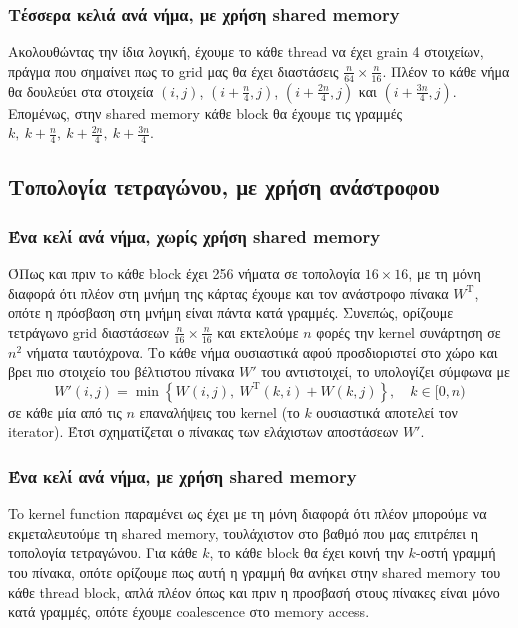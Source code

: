 \documentclass[11pt,a4paper,titlepage]{article}
\begin{document}
\subsubsection{Τέσσερα κελιά ανά νήμα, με χρήση shared memory}
Ακολουθώντας την ίδια λογική, έχουμε το κάθε thread να έχει grain 4 στοιχείων, πράγμα που σημαίνει πως το grid μας θα έχει διαστάσεις $\tfrac{n}{64}\times\tfrac{n}{16}$. Πλέον το κάθε νήμα θα δουλεύει στα στοιχεία $\left(i, j\right)$, $\left(i + \tfrac{n}{4}, j\right)$, $\left(i + \tfrac{2n}{4}, j\right)$ και $\left(i + \tfrac{3n}{4}, j\right)$. Επομένως, στην shared memory κάθε block θα έχουμε τις γραμμές $k,\ k + \tfrac{n}{4},\ k + \tfrac{2n}{4},\ k + \tfrac{3n}{4}$.


\subsection{Τοπολογία τετραγώνου, με χρήση ανάστροφου}

\subsubsection{Ένα κελί ανά νήμα, χωρίς χρήση shared memory}
ΌΠως και πριν τo κάθε block έχει 256 νήματα σε τοπολογία $16 \times 16$, με τη μόνη διαφορά ότι πλέον στη μνήμη της κάρτας έχουμε και τον ανάστροφο πίνακα $W^\mathrm{T}$, οπότε η πρόσβαση στη μνήμη είναι πάντα κατά γραμμές. Συνεπώς, ορίζουμε τετράγωνο grid διαστάσεων $\tfrac{n}{16}\times\tfrac{n}{16}$ και εκτελούμε $n$ φορές την kernel συνάρτηση σε $n^2$ νήματα ταυτόχρονα. Το κάθε νήμα ουσιαστικά αφού προσδιοριστεί στο χώρο και βρει πιο στοιχείο του βέλτιστου πίνακα $W'$ του αντιστοιχεί, το υπολογίζει σύμφωνα με
$$
	W'(i, j) = \min\left\{W(i, j),\ W^{\mathrm{T}}(k,i) + W(k,j)\right\},\quad k \in [0, n)
$$
σε κάθε μία από τις $n$ επαναλήψεις του kernel (το $k$ ουσιαστικά αποτελεί τον iterator). Έτσι σχηματίζεται ο πίνακας των ελάχιστων αποστάσεων $W'$.

\subsubsection{Ένα κελί ανά νήμα, με χρήση shared memory}
To kernel function παραμένει ως έχει με τη μόνη διαφορά ότι πλέον μπορούμε να εκμεταλευτούμε τη shared memory, τουλάχιστον στο βαθμό που μας επιτρέπει η τοπολογία τετραγώνου. Για κάθε $k$, το κάθε block θα έχει κοινή την $k$-οστή γραμμή του πίνακα, οπότε ορίζουμε πως αυτή η γραμμή θα ανήκει στην shared memory του κάθε thread block, απλά πλέον όπως και πριν η προσβασή στους πίνακες είναι μόνο κατά γραμμές, οπότε έχουμε coalescence στο memory access.
\end{document}
